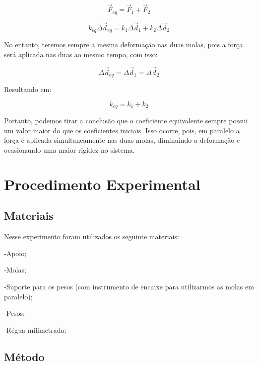 \documentclass[
	12pt,				%
	oneside,			%
	a4paper,			%
	english,			%
	french,				%
	spanish,			%
	brazil,				%
	]{abntex2}
\begin{document}
\begin{center}
\[
 \vec{F}_{eq} = \vec{F}_{1} + \vec{F}_{2}
\]
\end{center}

\begin{center}
\[
 k_{eq}\Delta\vec{d}_{eq} = k_{1}\Delta\vec{d}_{1} + k_{2}\Delta\vec{d}_{2}
\]
\end{center}

No entanto, teremos sempre a mesma deformação nas duas molas, pois a força será aplicada nas duas ao mesmo tempo, com isso:

\begin{center}
\[
 \Delta\vec{d}_{eq} = \Delta\vec{d}_{1} = \Delta\vec{d}_{2}
\]
\end{center}

Resultando em:

\begin{center}
\[
 k_{eq} = k_{1} + k_{2}
\]
\end{center}
	
Portanto, podemos tirar a conclusão que o coeficiente equivalente sempre possui um valor maior do que os coeficientes iniciais. Isso ocorre, pois, em paralelo a força é aplicada simultaneamente nas duas molas, diminuindo a deformação e ocasionando uma maior rigidez no sistema. \cite{UFC}

\newpage
\section[Procedimento Experimental]{Procedimento Experimental}
\pagestyle{fancy}
\subsection[Materiais]{Materiais}
Nesse experimento foram utilizados os seguinte materiais:

-Apoio;

-Molas;

-Suporte para os pesos (com instrumento de encaixe para utilizarmos as molas em paralelo);

-Pesos;

-Régua milimetrada;


\subsection[Método]{Método} 
\end{document}

